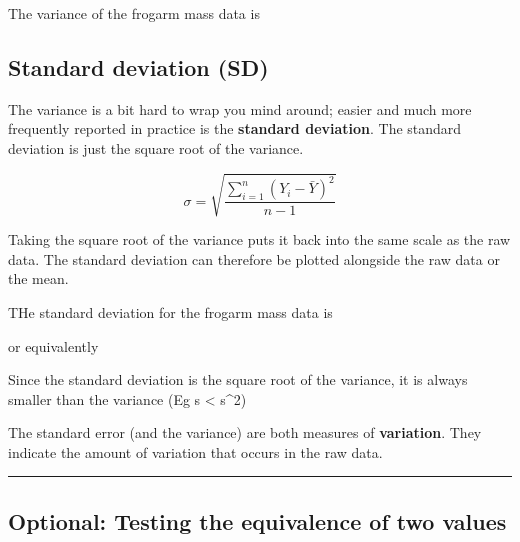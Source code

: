 \documentclass[]{book}
\newenvironment{Shaded}{\begin{snugshade}}{\end{snugshade}}
\newcommand{\KeywordTok}[1]{\textcolor[rgb]{0.13,0.29,0.53}{\textbf{#1}}}
\newcommand{\OperatorTok}[1]{\textcolor[rgb]{0.81,0.36,0.00}{\textbf{#1}}}
\newcommand{\NormalTok}[1]{#1}
\theoremstyle{definition}
\theoremstyle{definition}
\theoremstyle{definition}
\theoremstyle{remark}
\begin{document}
The variance of the frogarm mass data is

\begin{Shaded}
\end{Shaded}

\subsection{Standard deviation (SD)}\label{standard-deviation-sd}

The variance is a bit hard to wrap you mind around; easier and much more
frequently reported in practice is the \textbf{standard deviation}. The
standard deviation is just the square root of the variance.

\[\sigma = \sqrt{\frac{\sum\limits_{i=1}^{n} \left(Y_{i} - \bar{Y}\right)^{2}} {n-1}}\]

Taking the square root of the variance puts it back into the same scale
as the raw data. The standard deviation can therefore be plotted
alongside the raw data or the mean.

THe standard deviation for the frogarm mass data is

or equivalently

\begin{Shaded}
\end{Shaded}

Since the standard deviation is the square root of the variance, it is
always smaller than the variance (Eg s \textless{} s\^{}2)

The standard error (and the variance) are both measures of
\textbf{variation}. They indicate the amount of variation that occurs in
the raw data.

\begin{center}\rule{0.5\linewidth}{\linethickness}\end{center}

\subsection{Optional: Testing the equivalence of two
values}\label{optional-testing-the-equivalence-of-two-values}
\end{document}
